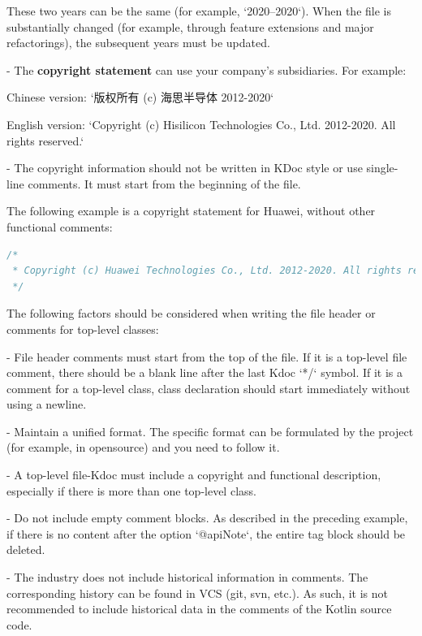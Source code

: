 These two years can be the same (for example, `2020–2020`). When the file is substantially changed (for example, through feature extensions and major refactorings), the subsequent years must be updated.



- The \textbf{copyright statement} can use your company's subsidiaries. For example: \

Chinese version: `版权所有 (c) 海思半导体 2012-2020` \

English version: `Copyright (c) Hisilicon Technologies Co., Ltd. 2012-2020. All rights reserved.` 



- The copyright information should not be written in KDoc style or use single-line comments. It must start from the beginning of the file.

The following example is a copyright statement for Huawei, without other functional comments:



\begin{lstlisting}[language=Kotlin]
/*
 * Copyright (c) Huawei Technologies Co., Ltd. 2012-2020. All rights reserved.
 */
\end{lstlisting}


The following factors should be considered when writing the file header or comments for top-level classes:

- File header comments must start from the top of the file. If it is a top-level file comment, there should be a blank line after the last Kdoc `*/` symbol. If it is a comment for a top-level class, class declaration should start immediately without using a newline.

- Maintain a unified format. The specific format can be formulated by the project (for example, in opensource) and you need to follow it.

- A top-level file-Kdoc must include a copyright and functional description, especially if there is more than one top-level class.

- Do not include empty comment blocks. As described in the preceding example, if there is no content after the option `@apiNote`, the entire tag block should be deleted.

- The industry does not include historical information in comments. The corresponding history can be found in VCS (git, svn, etc.). As such, it is not recommended to include historical data in the comments of the Kotlin source code.





